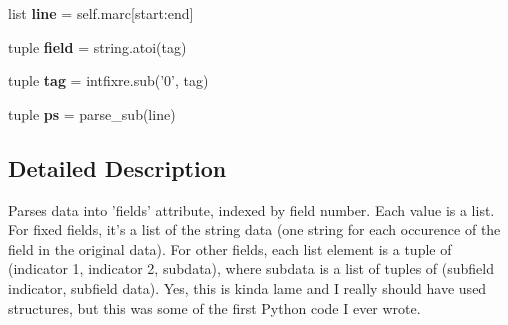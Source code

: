 \begin{DoxyCompactItemize}
\item 
\hypertarget{classcheshire3_1_1marc__utils_1_1_m_a_r_c_a39a2b7764461ca30dfe7317fe2fd5dbe}{list {\bfseries line} = self.\-marc\mbox{[}start\-:end\mbox{]}}\label{classcheshire3_1_1marc__utils_1_1_m_a_r_c_a39a2b7764461ca30dfe7317fe2fd5dbe}

\item 
\hypertarget{classcheshire3_1_1marc__utils_1_1_m_a_r_c_a70ed1b2bf4fdc6f7bc1a47229509b815}{tuple {\bfseries field} = string.\-atoi(tag)}\label{classcheshire3_1_1marc__utils_1_1_m_a_r_c_a70ed1b2bf4fdc6f7bc1a47229509b815}

\item 
\hypertarget{classcheshire3_1_1marc__utils_1_1_m_a_r_c_aebf934410f147e9bd6de2231583f9c0f}{tuple {\bfseries tag} = intfixre.\-sub('0', tag)}\label{classcheshire3_1_1marc__utils_1_1_m_a_r_c_aebf934410f147e9bd6de2231583f9c0f}

\item 
\hypertarget{classcheshire3_1_1marc__utils_1_1_m_a_r_c_a61747fc379f3d5d10405981f474de143}{tuple {\bfseries ps} = parse\-\_\-sub(line)}\label{classcheshire3_1_1marc__utils_1_1_m_a_r_c_a61747fc379f3d5d10405981f474de143}

\end{DoxyCompactItemize}


\subsection{Detailed Description}
\begin{DoxyVerb}Parses data into 'fields' attribute, indexed by field number.
Each value is a list.  For fixed fields, it's a list of the string data
(one string for each occurence of the field in the original data).  For
other fields, each list element is a tuple of (indicator 1, indicator 2,
subdata), where subdata is a list of tuples of (subfield indicator,
subfield data).  Yes, this is kinda lame and I really should have
used structures, but this was some of the first Python code I ever
wrote.
\end{DoxyVerb}
 

